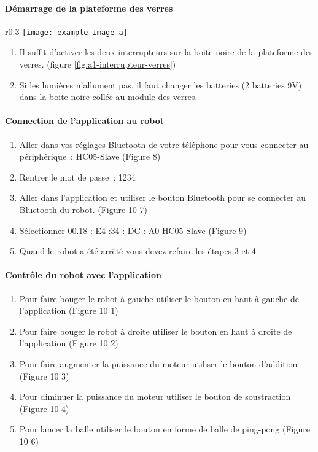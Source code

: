 \paragraph{Démarrage de la plateforme des verres}

\begin{wrapfigure}{r}{0.3\linewidth}
    \centering
    \texttt{[image: example-image-a]}
    \caption{Interrupteur de mise en marche de la plaque de verres}
    \label{fig:a1-interrupteur-verres}
\end{wrapfigure}

\begin{enumerate}
    \item Il suffit d’activer les deux interrupteurs sur la boite noire de la plateforme des verres. (figure \ref{fig:a1-interrupteur-verres})
    \item Si les lumières n’allument pas, il faut changer les batteries (2 batteries 9V) dans la boite noire collée au module des verres.
\end{enumerate}

\paragraph{Connection de l'application au robot}


\begin{enumerate}
    \item Aller dans vos réglages Bluetooth de votre téléphone pour vous connecter au périphérique : HC05-Slave (Figure 8)
    \item Rentrer le mot de passe : 1234
    \item Aller dans l’application et utiliser le bouton Bluetooth pour se connecter au Bluetooth du robot. (Figure 10 7)
    \item Sélectionner 00.18 : E4 :34 : DC : A0 HC05-Slave (Figure 9)
    \item Quand le robot a été arrêté vous devez refaire les étapes 3 et 4
\end{enumerate}

\paragraph{Contrôle du robot avec l’application}


\begin{enumerate}
    \item Pour faire bouger le robot à gauche utiliser le bouton en haut à gauche de l’application (Figure 10 1)
    \item Pour faire bouger le robot à droite utiliser le bouton en haut à droite de l’application (Figure 10 2)
    \item Pour faire augmenter la puissance du moteur utiliser le bouton d’addition (Figure 10 3)
    \item Pour diminuer la puissance du moteur utiliser le bouton de soustraction (Figure 10 4)
    \item Pour lancer la balle utiliser le bouton en forme de balle de ping-pong (Figure 10 6)
\end{enumerate}
